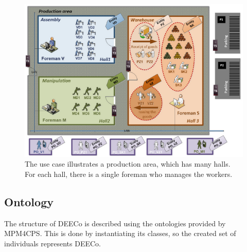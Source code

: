   
 \begin{figure}[!htb]
\centering
\includegraphics[scale=0.70]{figures/shifts}
\caption{The use case illustrates a production area, which has many halls. For each hall, there is a single foreman who manages the workers.}
\label{fig:shifts}
\end{figure}
 
\subsection{Ontology}
 The structure of DEECo is described using the ontologies provided by MPM4CPS. This is done by instantiating its classes, so the created set of individuals represents DEECo.
 
